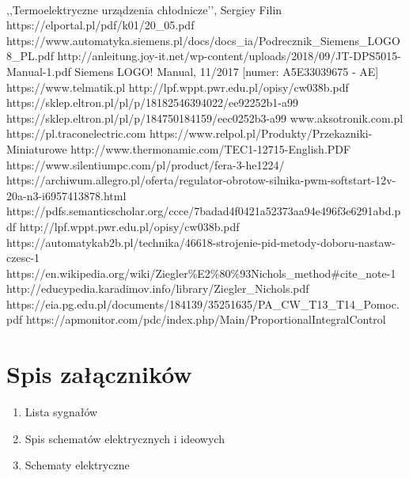 \documentclass[oneside]{mgr}
\begin{document}
\begin{thebibliography} 
\\
,,Termoelektryczne urządzenia chłodnicze’’, Sergiey Filin
https://elportal.pl/pdf/k01/20\_05.pdf
https://www.automatyka.siemens.pl/docs/docs\_ia/Podrecznik\_Siemens\_LOGO8\_PL.pdf
http://anleitung.joy-it.net/wp-content/uploads/2018/09/JT-DPS5015-Manual-1.pdf
Siemens LOGO! Manual, 11/2017 [numer: A5E33039675 - AE]
https://www.telmatik.pl
http://lpf.wppt.pwr.edu.pl/opisy/cw038b.pdf
https://sklep.eltron.pl/pl/p/18182546394022/ee92252b1-a99
https://sklep.eltron.pl/pl/p/184750184159/eec0252b3-a99
www.aksotronik.com.pl
https://pl.traconelectric.com
https://www.relpol.pl/Produkty/Przekazniki-Miniaturowe
http://www.thermonamic.com/TEC1-12715-English.PDF
https://www.silentiumpc.com/pl/product/fera-3-he1224/
https://archiwum.allegro.pl/oferta/regulator-obrotow-silnika-pwm-softstart-12v-20a-n3-i6957413878.html
https://pdfs.semanticscholar.org/ccce/7badad4f0421a52373aa94e496f3e6291abd.pdf
http://lpf.wppt.pwr.edu.pl/opisy/cw038b.pdf
https://automatykab2b.pl/technika/46618-strojenie-pid-metody-doboru-nastaw-czesc-1
https://en.wikipedia.org/wiki/Ziegler\%E2\%80\%93Nichols\_method\#cite\_note-1
http://educypedia.karadimov.info/library/Ziegler\_Nichols.pdf
https://eia.pg.edu.pl/documents/184139/35251635/PA\_CW\_T13\_T14\_Pomoc.pdf
https://apmonitor.com/pdc/index.php/Main/ProportionalIntegralControl
\end{thebibliography}

\listoffigures
{}
\listoftables
{}
\chapter*{Spis załączników}
\begin{enumerate}
    \item Lista sygnałów
    \item Spis schematów elektrycznych i ideowych
    \item Schematy elektryczne
\end{enumerate}
\end{document}
